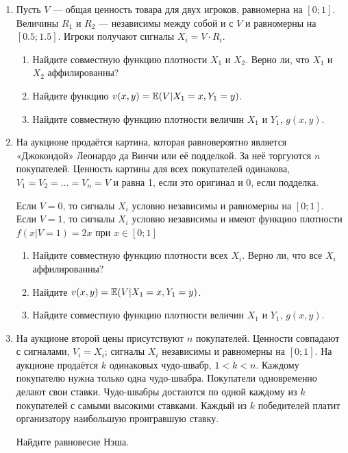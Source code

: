 \begin{enumerate}


\item Пусть $  V $ — общая ценность товара для двух игроков, равномерна на $ [0;1] $. Величины $ R_{1} $ и $ R_{2} $ — независимы между собой и с $ V $ и равномерны на $ [0.5;1.5] $. Игроки получают сигналы $ X_{i}=V\cdot R_{i} $.
\begin{enumerate}
\item Найдите совместную функцию плотности $ X_{1} $ и $ X_{2} $. Верно ли, что $ X_{1} $ и $ X_{2} $ аффилированны?
\item Найдите функцию $ v(x,y)=\operatorname{\mathbb{E}}(V|X_{1}=x,Y_{1}=y) $.
\item Найдите совместную функцию плотности величин $ X_{1} $ и $ Y_{1} $, $ g(x,y) $.
\end{enumerate}


\item На аукционе продаётся картина, которая равновероятно является «Джокондой» Леонардо да Винчи или её подделкой. За неё торгуются $ n $ покупателей. Ценность картины для всех покупателей одинакова, $ V_{1}=V_{2}=\ldots=V_{n}=V $ и равна 1, если это оригинал и 0, если подделка.

Если $ V=0 $, то сигналы $ X_{i} $ условно независимы и равномерны на $ [0;1] $. Если $ V=1 $, то сигналы $ X_{i} $ условно независимы и имеют функцию плотности $ f(x|V=1)=2x $ при  $x\in [0;1] $
\begin{enumerate}
\item Найдите совместную функцию плотности всех $ X_{i} $. Верно ли, что все $ X_{i} $ аффилированны?
\item Найдите $ v(x,y)=\operatorname{\mathbb{E}}(V|X_{1}=x,Y_{1}=y) $.
\item Найдите совместную функцию плотности величин $ X_{1} $ и $ Y_{1} $, $ g(x,y) $.
\end{enumerate}



\item На аукционе второй цены присутствуют $ n $ покупателей. Ценности совпадают с сигналами, $ V_{i}=X_{i} $; сигналы $ X_{i} $ независимы и равномерны на $ [0;1] $. На аукционе продаётся $k$ одинаковых чудо-швабр, $ 1<k<n $. Каждому покупателю нужна только одна чудо-швабра. Покупатели одновременно делают свои ставки. Чудо-швабры достаются по одной каждому из $ k $ покупателей с самыми высокими ставками. Каждый из $ k $ победителей платит организатору наибольшую проигравшую ставку.

Найдите равновесие Нэша.


\end{enumerate}
